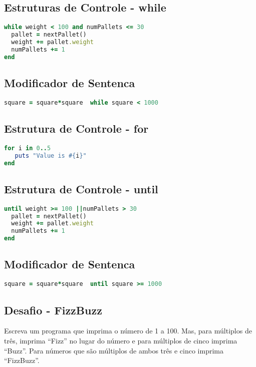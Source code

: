 \documentclass[serif,mathserif]{article}
\begin{document}
\subsection{Estruturas de Controle - while}
\begin{lstlisting}[language=ruby]
while weight < 100 and numPallets <= 30
  pallet = nextPallet()
  weight += pallet.weight
  numPallets += 1
end
\end{lstlisting}
 
\subsection {Modificador de Sentenca}
\begin{lstlisting}[language=ruby]
square = square*square  while square < 1000
\end{lstlisting}

\subsection{Estrutura de Controle -  for}
\begin{lstlisting}[language=ruby]
for i in 0..5
   puts "Value is #{i}"
end
\end{lstlisting}

\subsection{Estrutura de Controle -  until} 
\begin{lstlisting}[language=ruby]
until weight >= 100 ||numPallets > 30
  pallet = nextPallet()
  weight += pallet.weight
  numPallets += 1
end
\end{lstlisting}

\subsection {Modificador de Sentenca}
\begin{lstlisting}[language=ruby]
square = square*square  until square >= 1000
\end{lstlisting}

\subsection{Desafio - FizzBuzz}  
Escreva um programa que imprima o número de 1 a 100.
Mas, para múltiplos de três, imprima  ``Fizz'' no lugar do
número e para múltiplos de cinco imprima ``Buzz''. Para
números que são múltiplos de ambos três e cinco
imprima ``FizzBuzz''.
 
\end{document}
